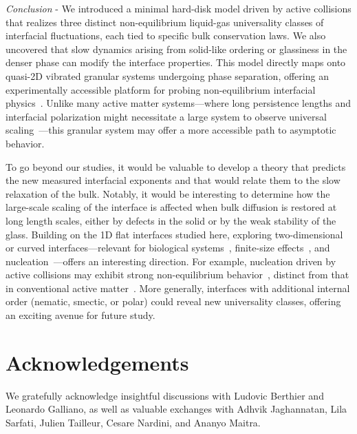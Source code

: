 \documentclass[aps,
reprint,
superscriptaddress,









amsmath,amssymb,floatfix,






prl
]{revtex4-2}
\begin{document}
\emph{Conclusion} - We introduced a minimal hard-disk model driven by active collisions that realizes three distinct non-equilibrium liquid-gas universality classes of interfacial fluctuations, each tied to specific bulk conservation laws. We also uncovered that slow dynamics arising from solid-like ordering or glassiness in the denser phase can modify the interface properties. This model directly maps onto quasi-2D vibrated granular systems undergoing phase separation, offering an experimentally accessible platform for probing non-equilibrium interfacial physics~\cite{maire2025dynamical}. Unlike many active matter systems---where long persistence lengths and interfacial polarization might necessitate a large system to observe universal scaling~\cite{Pérez-Bastías_Soto_2025, caprini2020spontaneous, Lee_2013, hermann2020active}---this granular system may offer a more accessible path to asymptotic behavior.

To go beyond our studies, it would be valuable to develop a theory that predicts the new measured interfacial exponents and that would relate them to the slow relaxation of the bulk. Notably, it would be interesting to determine how the large-scale scaling of the interface is affected when bulk diffusion is restored at long length scales, either by defects in the solid or by the weak stability of the glass.
Building on the 1D flat interfaces studied here, exploring two-dimensional or curved interfaces---relevant for biological systems~\cite{kuroda2025effects, hyde1996language, schamberger2023curvature, sabari2020biomolecular, brangwynne2009germline, molliex2015phase, liu2025nonequilibriumdynamicsmembranelessactive, zwicker2025physics}, finite-size effects~\cite{luu2013capillarylike}, and nucleation~\cite{cates2023Nucleation, langford2024mechanics, zakine2024unveiling, richard2016nucleation, sarma2025dynamic}---offers an interesting direction. For example, nucleation driven by active collisions may exhibit strong non-equilibrium behavior~\cite{maireThesis}, distinct from that in conventional active matter~\cite{cates2023Nucleation}. More generally, interfaces with additional internal order (nematic, smectic, or polar) could reveal new universality classes, offering an exciting avenue for future study.

\section{Acknowledgements}

We gratefully acknowledge insightful discussions with Ludovic Berthier and Leonardo Galliano, as well as valuable exchanges with Adhvik Jaghannatan, Lila Sarfati, Julien Tailleur, Cesare Nardini, and Ananyo Maitra.
\end{document}

